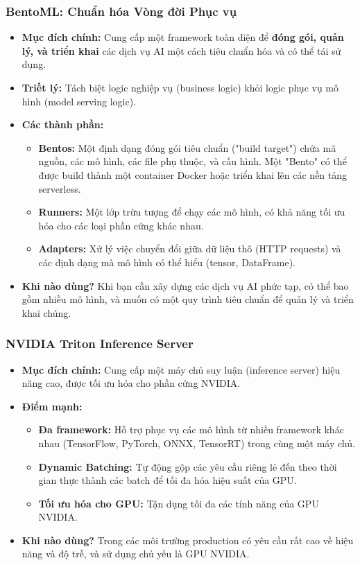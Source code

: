\subsubsection{BentoML: Chuẩn hóa Vòng đời Phục vụ}
\begin{itemize}
    \item \textbf{Mục đích chính:} Cung cấp một framework toàn diện để \textbf{đóng gói, quản lý, và triển khai} các dịch vụ AI một cách tiêu chuẩn hóa và có thể tái sử dụng.
    \item \textbf{Triết lý:} Tách biệt logic nghiệp vụ (business logic) khỏi logic phục vụ mô hình (model serving logic).
    \item \textbf{Các thành phần:}
        \begin{itemize}
            \item \textbf{Bentos:} Một định dạng đóng gói tiêu chuẩn ("build target") chứa mã nguồn, các mô hình, các file phụ thuộc, và cấu hình. Một "Bento" có thể được build thành một container Docker hoặc triển khai lên các nền tảng serverless.
            \item \textbf{Runners:} Một lớp trừu tượng để chạy các mô hình, có khả năng tối ưu hóa cho các loại phần cứng khác nhau.
            \item \textbf{Adapters:} Xử lý việc chuyển đổi giữa dữ liệu thô (HTTP requests) và các định dạng mà mô hình có thể hiểu (tensor, DataFrame).
        \end{itemize}
    \item \textbf{Khi nào dùng?} Khi bạn cần xây dựng các dịch vụ AI phức tạp, có thể bao gồm nhiều mô hình, và muốn có một quy trình tiêu chuẩn để quản lý và triển khai chúng.
\end{itemize}

\subsubsection{NVIDIA Triton Inference Server}
\begin{itemize}
    \item \textbf{Mục đích chính:} Cung cấp một máy chủ suy luận (inference server) hiệu năng cao, được tối ưu hóa cho phần cứng NVIDIA.
    \item \textbf{Điểm mạnh:}
        \begin{itemize}
            \item \textbf{Đa framework:} Hỗ trợ phục vụ các mô hình từ nhiều framework khác nhau (TensorFlow, PyTorch, ONNX, TensorRT) trong cùng một máy chủ.
            \item \textbf{Dynamic Batching:} Tự động gộp các yêu cầu riêng lẻ đến theo thời gian thực thành các batch để tối đa hóa hiệu suất của GPU.
            \item \textbf{Tối ưu hóa cho GPU:} Tận dụng tối đa các tính năng của GPU NVIDIA.
        \end{itemize}
    \item \textbf{Khi nào dùng?} Trong các môi trường production có yêu cầu rất cao về hiệu năng và độ trễ, và sử dụng chủ yếu là GPU NVIDIA.
\end{itemize}